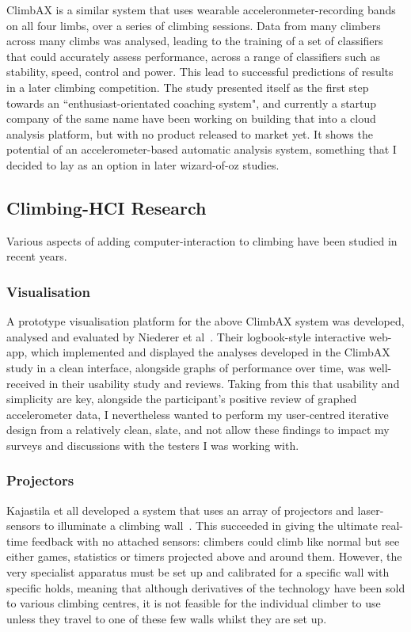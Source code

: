 ClimbAX \cite{climbaxstudy} is a similar system that uses wearable acceleronmeter-recording bands on all four limbs, over a series of climbing sessions.
Data from many climbers across many climbs was analysed, leading to the training of a set of classifiers that could accurately assess performance, across a range of classifiers such as stability, speed, control and power.
This lead  to successful predictions of results in a later climbing competition.
The study presented itself as the first step towards an ``enthusiast-orientated coaching system", and currently a startup company of the same name have been working on building that into a cloud analysis platform, but with no product released to market yet.
It shows the potential of an accelerometer-based automatic analysis system, something that I decided to lay as an option in later wizard-of-oz studies.


\subsection{Climbing-HCI Research}
Various aspects of adding computer-interaction to climbing have been studied in recent years.

\subsubsection{Visualisation}
A prototype visualisation platform for the above ClimbAX system was developed, analysed and evaluated by Niederer et al~\cite{niederervis}.
Their logbook-style interactive web-app, which implemented and displayed the analyses developed in the ClimbAX study in a clean interface, alongside graphs of performance over time, was well-received in their usability study and reviews.
Taking from this that usability and simplicity are key, alongside the participant's positive review of graphed accelerometer data, I nevertheless wanted to perform my user-centred iterative design from a relatively clean, slate, and not allow these findings to impact my surveys and discussions with the testers I was working with.

\subsubsection{Projectors}
Kajastila et all developed a system that uses an array of projectors and laser-sensors to illuminate a climbing wall~\cite{projectedclimbwall}.
This succeeded in giving the ultimate real-time feedback with no attached sensors: climbers could climb like normal but see either games, statistics or timers projected above and around them.
However, the very specialist apparatus must be set up and calibrated for a specific wall with specific holds, meaning that although derivatives of the technology have been sold to various climbing centres, it is not feasible for the individual climber to use unless they travel to one of these few walls whilst they are set up.

